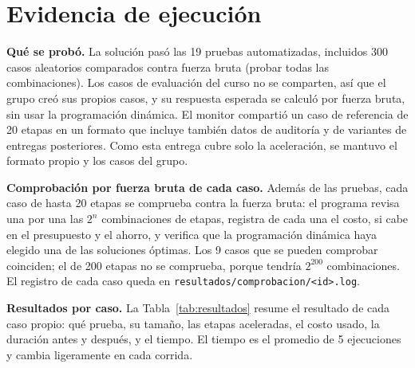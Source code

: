 \documentclass[11pt,a4paper]{article}
\theoremstyle{plano}
\begin{document}
\section{Evidencia de ejecución}
\label{sec:evid}

\textbf{Qué se probó.} La solución pasó las 19 pruebas automatizadas, incluidos 300 casos aleatorios comparados contra fuerza bruta (probar todas las combinaciones). Los casos de evaluación del curso no se comparten, así que el grupo creó sus propios casos, y su respuesta esperada se calculó por fuerza bruta, sin usar la programación dinámica. El monitor compartió un caso de referencia de 20 etapas en un formato que incluye también datos de auditoría y de variantes de entregas posteriores. Como esta entrega cubre solo la aceleración, se mantuvo el formato propio y los casos del grupo.

\textbf{Comprobación por fuerza bruta de cada caso.} Además de las pruebas, cada caso de hasta 20 etapas se comprueba contra la fuerza bruta: el programa revisa una por una las $2^n$ combinaciones de etapas, registra de cada una el costo, si cabe en el presupuesto y el ahorro, y verifica que la programación dinámica haya elegido una de las soluciones óptimas. Los 9 casos que se pueden comprobar coinciden; el de 200 etapas no se comprueba, porque tendría $2^{200}$ combinaciones. El registro de cada caso queda en \texttt{resultados/comprobacion/<id>.log}.

\textbf{Resultados por caso.} La Tabla~\ref{tab:resultados} resume el resultado de cada caso propio: qué prueba, su tamaño, las etapas aceleradas, el costo usado, la duración antes y después, y el tiempo. El tiempo es el promedio de 5 ejecuciones y cambia ligeramente en cada corrida.
\end{document}
